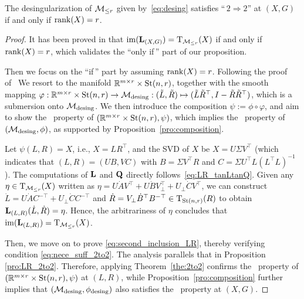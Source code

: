 \begin{proposition}\label{pro:desing_2to2}
    The desingularization of $\mathcal{M}_{\le r}$ given by~\eqref{eq:desing} satisfies ``\,$2\!\Rightarrow\!2$'' at $(X,G)$ if and only if $\operatorname{rank}(X) = r$.
\end{proposition}
\begin{proof}
    It has been proved in \cite[Proposition 2.9]{levin2025effect} that $\operatorname{im}(\mathrm{\bf L}_{(X,G)})=\mathrm{T}_{\mathcal{M}_{\le r}}(X)$ if and only if $\operatorname{rank}(X)=r$, which validates the ``only if\,'' part of our proposition.
    
    Then we focus on the ``if\,'' part by assuming $\operatorname{rank}(X)=r$. Following the proof of~\cite[Theorem~3]{yang2025spacedecouple} We resort to the manifold $\mathbb{R}^{m\times r} \times \mathrm{St}(n, r)$, together with the smooth mapping $\varphi:\mathbb{R}^{m\times r}\times \mathrm{St}(n, r) \rightarrow \mathcal{M}_{\mathrm{desing}}:(\tilde{L},\tilde{R})\mapsto (\tilde{L}\tilde{R}^\top, I-\tilde{R}\tilde{R}^\top)$, which is a submersion onto $\mathcal{M}_{\mathrm{desing}}$. We then introduce the composition ${\psi}:=\phi\circ\varphi$, and aim to show the \twototwo\ property of $(\mathbb{R}^{m\times r} \times \mathrm{St}(n, r),\psi)$, which implies the \twototwo\ property of $(\mathcal{M}_{\mathrm{desing}},\phi)$, as supported by Proposition~\ref{pro:composition}.

    Let $\psi(L,R)=X$, i.e., $X=LR^\top$, and the SVD of $X$ be $X=U\varSigma V^\top$ (which indicates that $(L,R)=(UB,VC)$ with $B=\varSigma V^\top R$ and $C=\varSigma U^\top L(L^\top L)^{-1}$). The computations of $\mathrm{\bf L}$ and $\mathrm{\bf Q}$ directly follows~\eqref{eq:LR_tanLtanQ}. Given any $\eta\in\mathrm{T}_{\mathcal{M}_{\le r}}(X)$ written as $\eta=U\dot{A}V^\top+U\dot{B}V_\bot^\top+U_\bot\dot{C}V^\top$, we can construct $\dot{L}=U\dot{A}C^{-\top}+U_\bot\dot{C}C^{-\top}$ and $\dot{R}=V_\bot\dot{B}^\top B^{-\top}\in\mathrm{T}_{\mathrm{St}(n,r)}(R)$ to obtain $\mathrm{\bf L}_{(L,R)}(\dot{L},\dot{R})=\eta$. Hence, the arbitrariness of $\eta$ concludes that $\operatorname{im}(\mathrm{\bf L}_{(L,R)})=\mathrm{T}_{\mathcal{M}_{\le r}}(X)$.     
    
    Then, we move on to prove \eqref{eq:second_inclusion_LR}, thereby verifying condition \eqref{eq:nece_suff_2to2}. The analysis parallels that in Proposition \ref{pro:LR_2to2}. Therefore, applying Theorem~\ref{the:2to2} confirms the \twototwo\ property of $(\mathbb{R}^{m\times r}\times\mathrm{St}(n,r),\psi)$ at $(L,R)$, while Proposition~\ref{pro:composition} further implies that $(\mathcal{M}_{\mathrm{desing}},\phi_{\mathrm{desing}})$ also satisfies the \twototwo\ property at $(X,G)$.
\end{proof}


